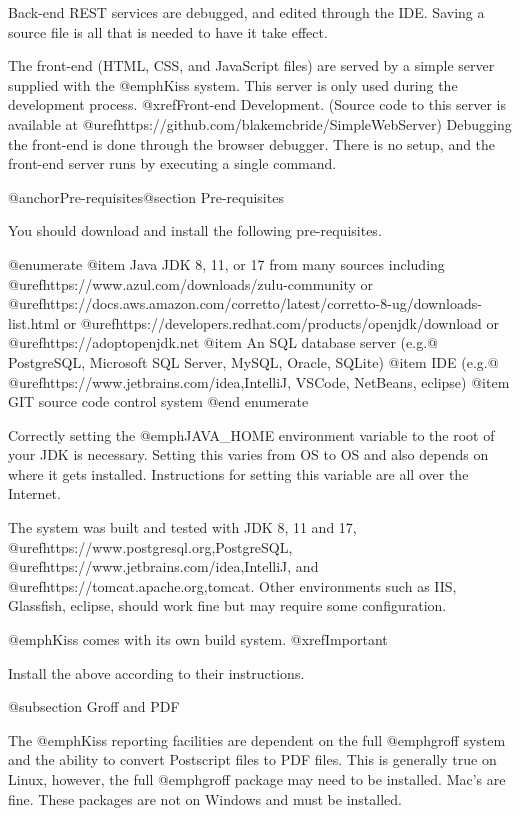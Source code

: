 Back-end REST services are debugged, and edited through the IDE.
Saving a source file is all that is needed to have it take effect.

The front-end (HTML, CSS, and JavaScript files) are served by a simple
server supplied with the @emph{Kiss} system.  This server is only used
during the development process.  @xref{Front-end Development}.
(Source code to this server is available at
@uref{https://github.com/blakemcbride/SimpleWebServer}) Debugging the
front-end is done through the browser debugger.  There is no setup,
and the front-end server runs by executing a single command.

@anchor{Pre-requisites}@section Pre-requisites

You should download and install the following pre-requisites.

@enumerate
@item
Java JDK 8, 11, or 17 from many sources including @uref{https://www.azul.com/downloads/zulu-community} or 
@uref{https://docs.aws.amazon.com/corretto/latest/corretto-8-ug/downloads-list.html} or
@uref{https://developers.redhat.com/products/openjdk/download} or
@uref{https://adoptopenjdk.net}
@item
An SQL database server (e.g.@ PostgreSQL, Microsoft SQL Server, MySQL,
Oracle, SQLite)
@item
IDE (e.g.@ @uref{https://www.jetbrains.com/idea,IntelliJ}, VSCode, NetBeans, eclipse)
@item
GIT source code control system
@end enumerate

Correctly setting the @emph{JAVA_HOME} environment variable to the root of your
JDK is necessary.  Setting this varies from OS to OS and also depends on where it
gets installed.  Instructions for setting this variable are all over the Internet.

The system was built and tested with JDK 8, 11 and 17,
@uref{https://www.postgresql.org,PostgreSQL},
@uref{https://www.jetbrains.com/idea,IntelliJ}, and
@uref{https://tomcat.apache.org,tomcat}.  Other environments such as 
IIS, Glassfish, eclipse, should work fine but may require some
configuration.

@emph{Kiss} comes with its own build system.  @xref{Important}

Install the above according to their instructions.

@subsection Groff and PDF

The @emph{Kiss} reporting facilities are dependent on the full
@emph{groff} system and the ability to convert Postscript files to PDF
files.  This is generally true on Linux, however, the full
@emph{groff} package may need to be installed.  Mac's are fine.  These
packages are not on Windows and must be installed.

